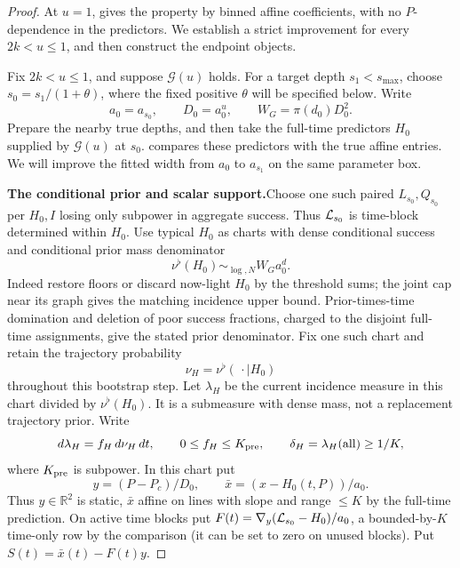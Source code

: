 \begin{proof}
At \(u=1\),  gives the
property by binned affine coefficients, with no \(P\)-dependence in
the predictors.  We establish a strict improvement for every
\(2k<u\le1\), and then construct the endpoint objects.

Fix \(2k<u\le1\), and suppose \(\mathcal G(u)\) holds.
For a target depth \(s_1<s_{\max}\), choose
\(s_0=s_1/(1+\theta)\), where the fixed positive \(\theta\)
will be specified below. Write
\[
 a_0=a_{s_0},\qquad D_0=a_0^u,\qquad
 W_G=\pi(d_0)D_0^2.
\]
Prepare the nearby true depths, and then take the full-time
predictors \(H_0\) supplied by \(\mathcal G(u)\) at \(s_0\).
 compares these predictors with
the true affine entries. We will improve the fitted width
from \(a_0\) to \(a_{s_1}\) on the same parameter box.

\par\smallskip\noindent\textbf{The conditional prior and scalar support.}\quad  Choose one such paired \(L_{s_0},Q_{s_0}\) per \(H_0,I\) losing only subpower in aggregate success. Thus \({\cal L}_{s_0}\) is time-block determined within \(H_0\). Use typical \(H_0\) as charts with dense conditional success and conditional prior mass denominator
\[
 \nu^\flat(H_0)\sim_{\log,N} W_G a_0^d .
\]
Indeed restore floors or discard now-light \(H_0\) by the threshold
sums; the joint cap near its graph gives the matching incidence
upper bound. Prior-times-time domination and deletion of poor
success fractions, charged to the disjoint full-time assignments,
give the stated prior denominator. Fix one such chart and retain
the trajectory probability
\[
 \nu_H=\nu^\flat(\,\cdot\mid H_0)
\]
throughout this bootstrap step. Let \(\lambda_H\) be the current
incidence measure in this chart divided by \(\nu^\flat(H_0)\).
It is a submeasure with dense mass, not a replacement trajectory
prior. Write
\[
 d\lambda_H=f_H\,d\nu_H\,dt,\qquad
 0\le f_H\le K_{\rm pre},\qquad
 \delta_H=\lambda_H(\mathrm{all})\ge1/K,
\]
where \(K_{\rm pre}\) is subpower. In this chart put
\[
 y=(P-P_c)/D_0,\qquad \bar x=(x-H_0(t,P))/a_0 .
\]
Thus \(y\in\mathbb R^2\) is static, \(\bar x\) affine on lines with slope and range \(\le K\) by the full-time prediction. On active time blocks put \(F(t)=\nabla_y({\cal L}_{s_0}-H_0)/a_0\), a bounded-by-\(K\) time-only row by the comparison (it can be set to zero on unused blocks). Put \(S(t)=\bar x(t)-F(t)y\).


\end{proof}
